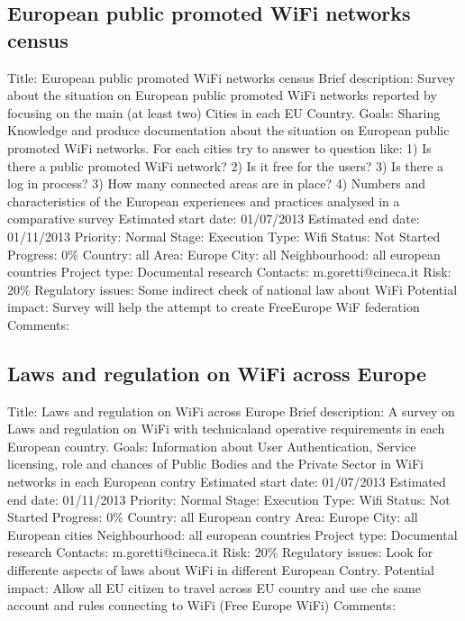 \documentclass[draftclsnofoot,12pt,journal,onecolumn]{IEEEtran}
\begin{document}
\subsection{European public promoted WiFi networks census} 
Title: European public promoted WiFi networks census 
Brief description: Survey  about the situation on European public promoted 
WiFi networks reported by focusing on the main (at least two) Cities in each 
EU Country. 
Goals: Sharing Knowledge and produce documentation about the situation on 
European public promoted WiFi networks.  For each cities try to answer to 
question like: 1) Is there a public promoted WiFi network? 2) Is it free for 
the users? 3) Is there a log in process? 3) How many connected areas are in 
place? 4) Numbers and characteristics of the European experiences and 
practices analysed in a comparative survey 
Estimated start date: 01/07/2013 
Estimated end date: 01/11/2013 
Priority: Normal 
Stage: Execution 
Type: Wifi 
Status: Not Started 
Progress: 0\% 
Country: all 
Area: Europe 
City: all 
Neighbourhood: all european countries 
Project type: Documental research 
Contacts: m.goretti@cineca.it
Risk: 20\% 
Regulatory issues: Some indirect check of national law about WiFi 
Potential impact: Survey will help the attempt to create FreeEurope WiF 
federation 
Comments: 
\subsection{Laws and regulation on WiFi across Europe} 
Title: Laws and regulation on WiFi across Europe 
Brief description:  A survey on Laws and regulation on WiFi with technicaland 
operative requirements in each European country. 
Goals: Information about User Authentication, Service licensing, role and 
chances of Public Bodies and the Private Sector in WiFi networks in each 
European contry 
Estimated start date: 01/07/2013 
Estimated end date: 01/11/2013 
Priority: Normal 
Stage: Execution 
Type: Wifi 
Status: Not Started 
Progress: 0\% 
Country: all European contry 
Area: Europe 
City: all European cities 
Neighbourhood: all european countries 
Project type: Documental research 
Contacts: m.goretti@cineca.it
Risk: 20\% 
Regulatory issues: Look for differente aspects of laws about WiFi in 
different European Contry. 
Potential impact: Allow all EU citizen to travel across EU country and use 
che same account and rules connecting to WiFi (Free Europe WiFi) 
Comments: 
\end{document}
